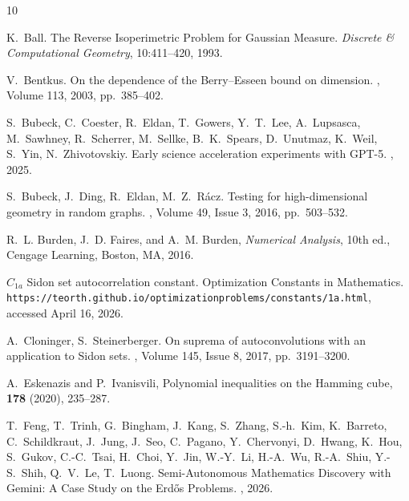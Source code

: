 \documentclass[11pt]{article}
\begin{document}

\begin{thebibliography}{10}


K.~Ball.
\newblock The Reverse Isoperimetric Problem for Gaussian Measure.
\newblock \emph{Discrete \& Computational Geometry}, 10:411--420, 1993.

V.~Bentkus.
\newblock On the dependence of the Berry--Esseen bound on dimension.
, Volume 113,
2003, pp.~385--402.


S.~Bubeck, C.~Coester, R.~Eldan, T.~Gowers, Y.~T.~Lee, A.~Lupsasca,
M.~Sawhney, R.~Scherrer, M.~Sellke, B.~K.~Spears, D.~Unutmaz,
K.~Weil, S.~Yin, N.~Zhivotovskiy.
\newblock Early science acceleration experiments with GPT-5.
,
2025.

S.~Bubeck, J.~Ding, R.~Eldan, M.~Z.~R\'acz.
\newblock Testing for high-dimensional geometry in random graphs.
, Volume 49, Issue 3,
2016, pp.~503--532.

R.~L. Burden, J.~D. Faires, and A.~M. Burden,
\emph{Numerical Analysis},
10th ed.,
Cengage Learning, Boston, MA, 2016.

$C_{1a}$ Sidon set autocorrelation constant. 
\newblock Optimization Constants in Mathematics.
\newblock \texttt{https://teorth.github.io/optimizationproblems/constants/1a.html},
accessed April 16, 2026.

A.~Cloninger, S.~Steinerberger.
\newblock On suprema of autoconvolutions with an application to Sidon sets.
, Volume 145, Issue 8,
2017, pp.~3191--3200.

A.~Eskenazis and P.~Ivanisvili,
\newblock Polynomial inequalities on the Hamming cube,
 {\bf 178} (2020), 235--287.

T.~Feng, T.~Trinh, G.~Bingham, J.~Kang, S.~Zhang, S.-h.~Kim, K.~Barreto,
C.~Schildkraut, J.~Jung, J.~Seo, C.~Pagano, Y.~Chervonyi, D.~Hwang,
K.~Hou, S.~Gukov, C.-C.~Tsai, H.~Choi, Y.~Jin, W.-Y.~Li, H.-A.~Wu,
R.-A.~Shiu, Y.-S.~Shih, Q.~V.~Le, T.~Luong.
\newblock Semi-Autonomous Mathematics Discovery with Gemini: A Case Study on the Erd\H{o}s Problems.
,
2026.


\end{thebibliography}
\end{document}
